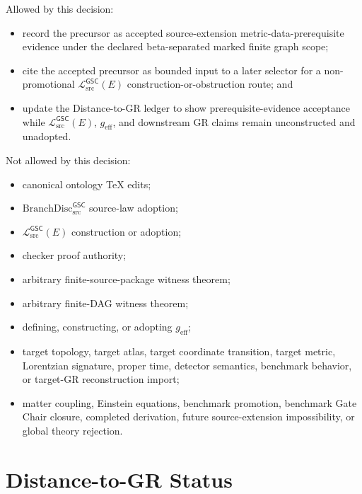 \documentclass[11pt]{article}
\newcommand{\BranchDisc}{\mathrm{BranchDisc}_{\mathrm{src}}^{\mathsf{GSC}}}
\newcommand{\MetricData}{\mathcal{L}_{\mathrm{src}}^{\mathsf{GSC}}}
\newcommand{\geff}{g_{\mathrm{eff}}}
\begin{document}
Allowed by this decision:
\begin{itemize}[leftmargin=*]
  \item record the precursor as accepted source-extension
  metric-data-prerequisite evidence under the declared beta-separated marked
  finite graph scope;
  \item cite the accepted precursor as bounded input to a later selector for a
  non-promotional \(\MetricData(E)\) construction-or-obstruction route; and
  \item update the Distance-to-GR ledger to show prerequisite-evidence
  acceptance while \(\MetricData(E)\), \(\geff\), and downstream GR claims
  remain unconstructed and unadopted.
\end{itemize}

Not allowed by this decision:
\begin{itemize}[leftmargin=*]
  \item canonical ontology TeX edits;
  \item \(\BranchDisc\) source-law adoption;
  \item \(\MetricData(E)\) construction or adoption;
  \item checker proof authority;
  \item arbitrary finite-source-package witness theorem;
  \item arbitrary finite-DAG witness theorem;
  \item defining, constructing, or adopting \(\geff\);
  \item target topology, target atlas, target coordinate transition, target
  metric, Lorentzian signature, proper time, detector semantics, benchmark
  behavior, or target-GR reconstruction import;
  \item matter coupling, Einstein equations, benchmark promotion, benchmark
  Gate Chair closure, completed derivation, future source-extension
  impossibility, or global theory rejection.
\end{itemize}

\section{Distance-to-GR Status}
\end{document}
